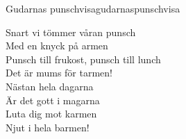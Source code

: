 \begin{song}{Gudarnas punschvisa}{gudarnaspunschvisa}
\begin{vers}
Snart vi tömmer våran punsch\\
Med en knyck på armen\\
Punsch till frukost, punsch till lunch\\
Det är mums för tarmen!\\
Nästan hela dagarna\\
Är det gott i magarna\\
Luta dig mot karmen\\
Njut i hela barmen!\\
\end{vers}
\end{song}
